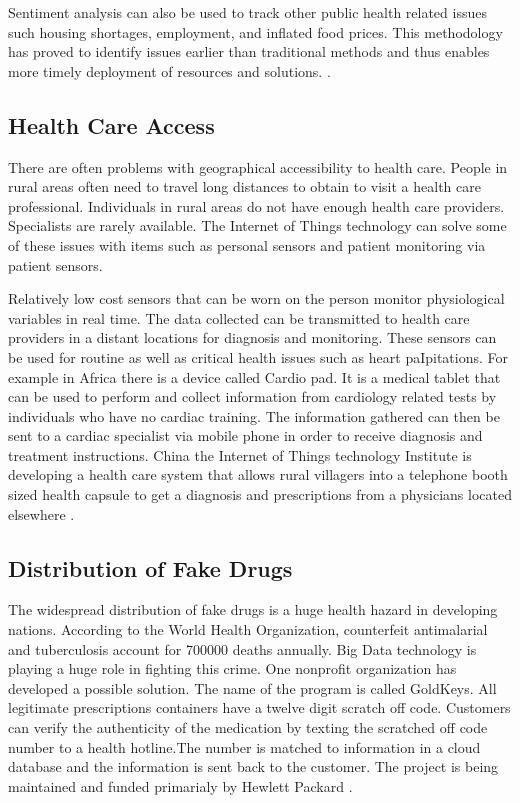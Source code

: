 \documentclass[sigconf]{acmart}
\begin{document}
Sentiment analysis can also be used to track other public health related issues such housing shortages, employment, and inflated food prices.  This methodology has proved to identify issues earlier than traditional methods and thus enables more timely deployment of resources and solutions. \cite{www-google-GloPls}. 

\subsection{Health Care Access}
There are often problems with geographical accessibility to health care. People in rural areas often need to travel long distances to obtain to visit a health care professional. Individuals in rural areas do not have enough health care providers. Specialists are rarely available. The Internet of Things technology can solve some of these issues with items such as personal sensors and patient monitoring via patient sensors. 

Relatively low cost sensors that can be worn on the person monitor physiological variables in real time.  The data collected can be transmitted to health care providers in a distant locations for diagnosis and monitoring. These sensors can be used for routine as well as critical health issues such as heart paIpitations. For example in Africa there is a device called Cardio pad. It is a medical  tablet that can be used to perform and collect information from cardiology related tests by individuals who have no cardiac training. The information gathered can then be sent to a cardiac specialist via mobile phone in order to receive diagnosis and treatment instructions. China the Internet of Things technology Institute is developing a health care system that allows rural villagers into a telephone booth sized health capsule to get a diagnosis and prescriptions from a physicians located elsewhere \cite{DevEcon}. 

\subsection{Distribution of Fake Drugs}
The widespread distribution of fake drugs is a huge health hazard in developing nations. According to the World Health Organization, counterfeit antimalarial and tuberculosis account for 700000 deaths annually. Big Data technology is playing a huge role in fighting this crime. One nonprofit organization has developed a possible solution. The name of the program is called GoldKeys. All legitimate prescriptions containers have a twelve digit scratch off code. Customers can verify the authenticity of the medication by texting the scratched off code number to a health hotline.The number is matched to information in a cloud database and the information is sent back to the customer. The project is being maintained and funded primarialy by Hewlett Packard \cite{DevEcon}. 
\end{document}
